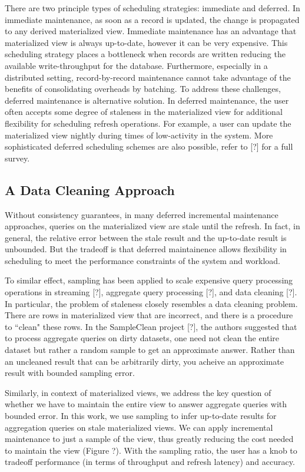 There are two principle types of scheduling strategies: immediate and deferred. 
In immediate maintenance, as soon as a record is updated, 
the change is propagated to any derived materialized view.
Immediate maintenance has an advantage that materialized view is always up-to-date, 
however it can be very expensive.
This scheduling strategy places a bottleneck when records are written reducing 
the available write-throughput for the database.
Furthermore, especially in a distributed setting, record-by-record 
maintenance cannot take advantage of the benefits of consolidating overheads by batching.
To address these challenges, deferred maintenance is alternative solution.
In deferred maintenance, the user often accepts some degree of staleness in 
the materialized view for additional flexibility for scheduling refresh operations.
For example, a user can update the materialized view 
nightly during times of low-activity in the system.
More sophisticated deferred scheduling schemes are also possible, refer to [?] for a full survey.

\subsection{A Data Cleaning Approach}
Without consistency guarantees, in many deferred incremental maintenance approaches, 
queries on the materialized view are stale until the refresh.
In fact, in general, the relative error between the stale result and the up-to-date result is unbounded.
But the tradeoff is that deferred maintainence allows flexibility in scheduling to meet the performance constraints
of the system and workload.

To similar effect, sampling has been applied to scale expensive query processing operations in streaming [?], 
aggregate query processing [?], and data cleaning [?].
In particular, the problem of staleness closely resembles a data cleaning problem.
There are rows in materialized view that are incorrect, and there is a procedure to ``clean" these rows.
In the SampleClean project [?], the authors suggested that to process aggregate queries on dirty datasets, 
one need not clean the entire dataset but rather a random sample to get an approximate answer.
Rather than an uncleaned result that can be arbitrarily dirty, you acheive an approximate result with bounded sampling error. 

Similarly, in context of materialized views, we address the key question of whether we have to maintain the entire 
view to answer aggregate queries with bounded error.
In this work, we use sampling to infer up-to-date results for aggregation queries on stale materialized views. 
We can apply incremental maintenance to just a sample of the view, thus greatly reducing the cost needed to maintain the view (Figure ?). 
With the sampling ratio, the user has a knob to tradeoff performance (in terms of throughput and refresh latency) and accuracy.

